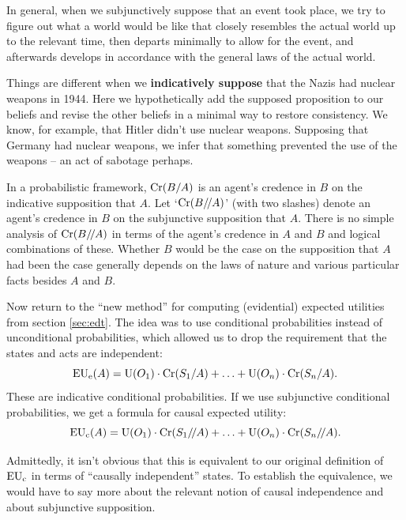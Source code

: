 In general, when we subjunctively suppose that an event took place, we try to
figure out what a world would be like that closely resembles the actual world up
to the relevant time, then departs minimally to allow for the event, and
afterwards develops in accordance with the general laws of the actual world.

Things are different when we \textbf{indicatively suppose} that the Nazis had
nuclear weapons in 1944. Here we hypothetically add the supposed proposition to
our beliefs and revise the other beliefs in a minimal way to restore
consistency. We know, for example, that Hitler didn't use nuclear weapons.
Supposing that Germany had nuclear weapons, we infer that something prevented
the use of the weapons -- an act of sabotage perhaps.

In a probabilistic framework, $\text{Cr}(B/A)$ is an agent's credence in $B$ on the
indicative supposition that $A$. Let `$\text{Cr}(B/\!/A)$' (with two slashes) denote an
agent's credence in $B$ on the subjunctive supposition that $A$. There is no
simple analysis of $\text{Cr}(B/\!/A)$ in terms of the agent's credence in $A$ and $B$
and logical combinations of these. Whether $B$ would be the case on the
supposition that $A$ had been the case generally depends on the laws of nature
and various particular facts besides $A$ and $B$.


Now return to the ``new method'' for computing (evidential) expected utilities
from section \ref{sec:edt}. The idea was to use conditional probabilities
instead of unconditional probabilities, which allowed us to drop the requirement
that the states and acts are independent:
\[
  \text{EU}_\text{e}(A) = \text{U}(O_1) \cdot \text{Cr}(S_1/A) + \ldots + \text{U}(O_n) \cdot \text{Cr}(S_n/A).
\]
These are indicative conditional probabilities. If we use subjunctive
conditional probabilities, we get a formula for causal expected utility:
\[
  \text{EU}_\text{c}(A) = \text{U}(O_1) \cdot \text{Cr}(S_1/\!/A) + \ldots + \text{U}(O_n) \cdot \text{Cr}(S_n/\!/A).
\]

Admittedly, it isn't obvious that this is equivalent to our original definition
of $\text{EU}_\text{c}$ in terms of ``causally independent'' states. To establish the
equivalence, we would have to say more about the relevant notion of causal
independence and about subjunctive supposition.

